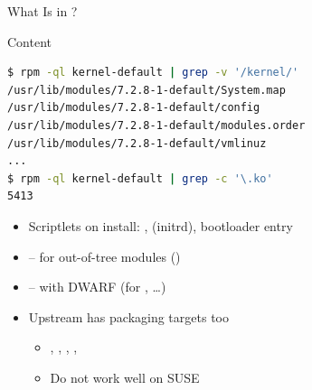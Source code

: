 \begin{frame}[fragile]{What Is in ?}

  \begin{block}{ Content}
    \begin{lstlisting}[language=bash]
$ rpm -ql kernel-default | grep -v '/kernel/'
/usr/lib/modules/7.2.8-1-default/System.map
/usr/lib/modules/7.2.8-1-default/config
/usr/lib/modules/7.2.8-1-default/modules.order
/usr/lib/modules/7.2.8-1-default/vmlinuz
...
$ rpm -ql kernel-default | grep -c '\.ko'
5413
    \end{lstlisting}
  \end{block}

  \pause

  \begin{itemize}[<+->]
    \item Scriptlets on install: ,  (initrd), bootloader entry
    \item {} -- for out-of-tree modules
      ()
    \item {} --  with DWARF (for , \ldots)
    \item Upstream has packaging targets too
      \begin{itemize}[<.->]
	\item {}, , , , 
	\item Do not work well on SUSE
      \end{itemize}
  \end{itemize}

\end{frame}
